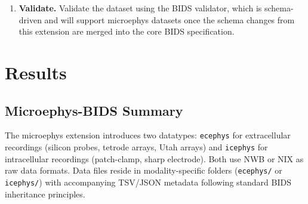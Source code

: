 \documentclass[fleqn,10pt]{article}
\begin{document}
\begin{enumerate}[noitemsep]
	      Review and complete the generated metadata.
	      NWB and NIX files may not contain all metadata required by BIDS (for example, stereotaxic surgical coordinates or species-specific fields in \verb|participants.tsv|).
	      The specification itself documents all required and recommended fields; consulting it is essential to identify what must be added beyond what automated tools can extract.
	\item \textbf{Validate.}
	      Validate the dataset using the BIDS validator, which is schema-driven and will support microephys datasets once the schema changes from this extension are merged into the core BIDS specification.
\end{enumerate}

\section*{Results}\label{sec:results}

\subsection*{Microephys-BIDS Summary}\label{sec:microephys-summary}

The microephys extension introduces two datatypes: \texttt{ecephys} for extracellular recordings (silicon probes, tetrode arrays, Utah arrays) and \texttt{icephys} for intracellular recordings (patch-clamp, sharp electrode).
Both use NWB or NIX as raw data formats.
Data files reside in modality-specific folders (\texttt{ecephys/} or \texttt{icephys/}) with accompanying TSV/JSON metadata following standard BIDS inheritance principles.
\end{document}
